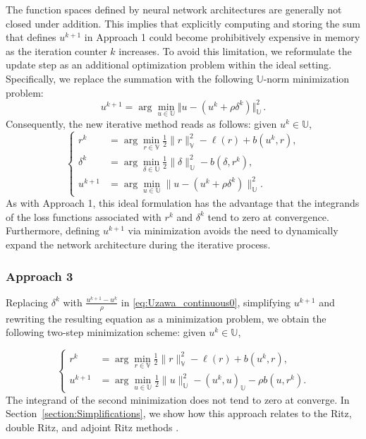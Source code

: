 \documentclass{article}
\theoremstyle{definition}
\begin{document}
The function spaces defined by neural network architectures are generally not closed under addition. This implies that explicitly computing and storing the sum that defines $u^{k+1}$ in Approach 1 could become prohibitively expensive in memory as the iteration counter $k$ increases. To avoid this limitation, we reformulate the update step as an additional optimization problem within the ideal setting. Specifically, we replace the summation with the following $\mathbb{U}$-norm minimization problem:
\begin{equation}
    u^{k+1} = \displaystyle\arg\min_{u\in\mathbb{U}} \Vert u - (u^k + \rho \delta^k)\Vert_{\mathbb{U}}^2\,.
\end{equation}
Consequently, the new iterative method reads as follows: given $u^k\in\mathbb{U}$,
\begin{equation}\label{eq:approach2_exact}
    \left\{
    \begin{aligned}
        r^{k}    &= \arg\min_{r \in \mathbb{V}} \frac{1}{2} \|r\|^2_{\mathbb{V}} - \ell(r) + b(u^k,r), \\[1ex]
        \delta^{k} &= \arg\min_{\delta \in \mathbb{U}} \frac{1}{2} \|\delta\|^2_{\mathbb{U}} - b(\delta,r^{k}), \\[1ex]
        u^{k+1}  &= \arg\min_{u \in \mathbb{U}} \| u - (u^k + \rho \delta^k) \|_{\mathbb{U}}^2.
    \end{aligned}
    \right.
\end{equation} 
As with Approach 1, this ideal formulation has the advantage that the integrands of the loss functions associated with $r^k$ and $\delta^k$ tend to zero at convergence. Furthermore, defining $u^{k+1}$ via minimization avoids the need to dynamically expand the network architecture during the iterative process.

\subsubsection{Approach 3} \label{subsection:main_approach3}

Replacing $\delta^k$ with $\frac{u^{k+1}-u^k}{\rho}$ in \eqref{eq:Uzawa_continuous0}, simplifying $u^{k+1}$ and rewriting the resulting equation as a minimization problem, we obtain the following two-step minimization scheme: given $u^k\in\mathbb U$,

\begin{equation}
    \left\{
    \begin{aligned}
        r^{k}   &= \arg\min_{r \in \mathbb{V}} \frac{1}{2} \|r\|^2_{\mathbb{V}} - \ell(r) + b(u^k,r), \\[2ex]
        u^{k+1} &= \arg\min_{u \in \mathbb{U}} \frac{1}{2} \|u\|^2_{\mathbb{U}} - (u^{k},u)_{\mathbb{U}} - \rho b(u,r^{k}).
    \end{aligned}
    \right.
    \label{eq:Ritz-Uzawa_two_eqs}
\end{equation} The integrand of the second minimization does not tend to zero at converge.
In Section~\ref{section:Simplifications}, we show how this approach relates to the Ritz, double Ritz, and adjoint Ritz methods \cite{EYu2018DeepRitz,uriarte2023DoubleRitz}.
\end{document}
